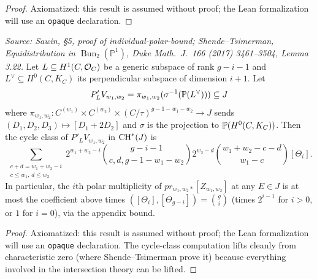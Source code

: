\begin{proof}
  Axiomatized: this result is assumed without proof; the Lean formalization will use
  an \texttt{opaque} declaration.
\end{proof}

\begin{lemma}
  \label{lem:ts_3_22}
  \textit{Source: Sawin, §5, proof of individual-polar-bound; Shende--Tsimerman,
  \emph{Equidistribution in $\operatorname{Bun}_2(\mathbb P^1)$}, Duke Math.\ J.\
  166 (2017) 3461--3504, Lemma 3.22.}
  Let $L\subseteq H^1(C,\mathcal{O}_C)$ be a generic subspace of rank $g-i-1$ and
  $L^\vee\subseteq H^0(C,K_C)$ its perpendicular subspace of dimension $i+1$.  Let
  \[ P'_L V_{w_1,w_2} = \pi_{w_1,w_2}(\sigma^{-1}(\mathbb{P}(L^\vee))) \subseteq J \]
  where $\pi_{w_1,w_2}:C^{(w_1)}\times C^{(w_2)}\times(C/\tau)^{g-1-w_1-w_2}\to J$
  sends $(D_1,D_2,D_3)\mapsto [D_1+2D_2]$ and $\sigma$ is the projection to
  $\mathbb{P}(H^0(C,K_C))$.  Then the cycle class of $P'_L V_{w_1,w_2}$ in $\operatorname{CH}^*(J)$ is
  \[ \sum_{\substack{c+d=w_1+w_2-i\\ c\le w_1,\,d\le w_2}}
     2^{w_1+w_2-i}\binom{g-i-1}{c,d,g-1-w_1-w_2}2^{w_2-d}
     \binom{w_1+w_2-c-d}{w_1-c}[\Theta_i]. \]
  In particular, the $i$th polar multiplicity of $pr_{w_1,w_2*}[Z_{w_1,w_2}]$ at
  any $E\in J$ is at most the coefficient above times
  $([\Theta_i],[\Theta_{g-i}])=\binom{g}{i}$ (times $2^{i-1}$ for $i>0$, or $1$ for
  $i=0$), via the appendix bound.
\end{lemma}

\begin{proof}
  Axiomatized: this result is assumed without proof; the Lean formalization will use
  an \texttt{opaque} declaration.  The cycle-class computation lifts cleanly from
  characteristic zero (where Shende--Tsimerman prove it) because everything involved
  in the intersection theory can be lifted.
\end{proof}

